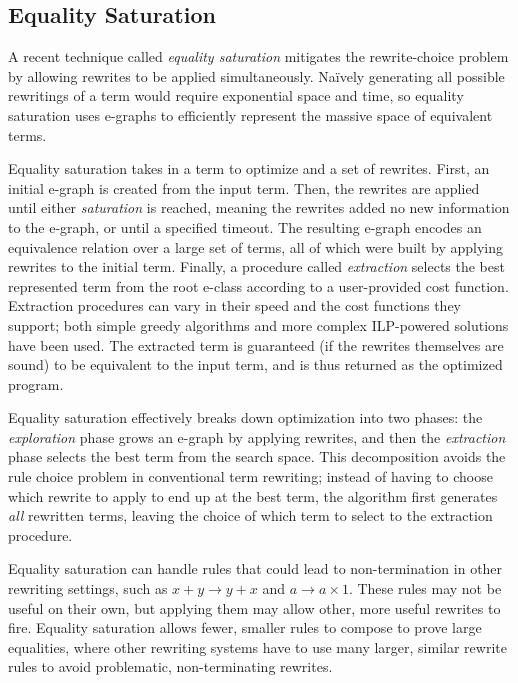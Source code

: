\documentclass{article}
\begin{document}
\subsection{Equality Saturation}

A recent technique called \textit{equality saturation} \cite{eqsat, eqsat-llvm, egg}
mitigates the rewrite-choice problem by allowing rewrites to be applied simultaneously.
Na{\"i}vely generating all possible rewritings of a term would require exponential space and time, 
so equality saturation uses e-graphs to efficiently represent the massive space of equivalent terms.

Equality saturation takes in a term to optimize and a set of rewrites.
First, an initial e-graph is created from the input term.
Then, the rewrites are applied until either \textit{saturation} is reached, 
meaning the rewrites added no new information to the e-graph, or until a specified timeout.
The resulting e-graph encodes an equivalence relation over a large set of terms, all of which were built by applying rewrites to the initial term.
Finally, a procedure called \textit{extraction} selects the best represented term from the root e-class according to a user-provided cost function.
Extraction procedures can vary in their speed and the cost functions they support; 
both simple greedy algorithms \cite{herbie} and more complex ILP-powered solutions \cite{eqsat, spores} have been used.
The extracted term is guaranteed (if the rewrites themselves are sound) to be equivalent to the input term, 
and is thus returned as the optimized program.

Equality saturation effectively breaks down optimization into two phases:
the \textit{exploration} phase grows an e-graph by applying rewrites,
and then the \textit{extraction} phase selects the best term from the search space.
This decomposition avoids the rule choice problem in conventional term rewriting;
instead of having to choose which rewrite to apply to end up at the best term,
the algorithm first generates \emph{all} rewritten terms,
leaving the choice of which term to select to the extraction procedure.

Equality saturation can handle rules that could lead to non-termination in other rewriting settings, 
such as $x + y \to y + x$ and $a \to a \times 1$.
These rules may not be useful on their own, but applying them may allow other, more useful rewrites to fire.
Equality saturation allows fewer, smaller rules to compose to prove large equalities,
  where other rewriting systems have to use many larger, similar rewrite rules to avoid problematic, non-terminating rewrites.
  
\end{document}
